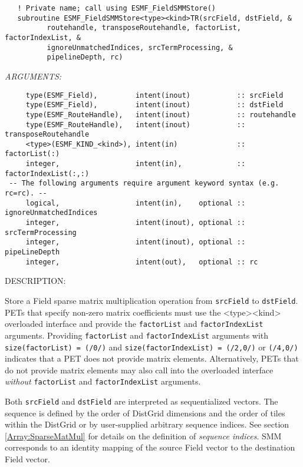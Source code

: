    
\begin{verbatim}   ! Private name; call using ESMF_FieldSMMStore() 
   subroutine ESMF_FieldSMMStore<type><kind>TR(srcField, dstField, & 
          routehandle, transposeRoutehandle, factorList, factorIndexList, &
          ignoreUnmatchedIndices, srcTermProcessing, &
          pipelineDepth, rc)
   \end{verbatim}{\em ARGUMENTS:}
\begin{verbatim}     type(ESMF_Field),         intent(inout)           :: srcField  
     type(ESMF_Field),         intent(inout)           :: dstField  
     type(ESMF_RouteHandle),   intent(inout)           :: routehandle
     type(ESMF_RouteHandle),   intent(inout)           :: transposeRoutehandle
     <type>(ESMF_KIND_<kind>), intent(in)              :: factorList(:) 
     integer,                  intent(in),             :: factorIndexList(:,:) 
 -- The following arguments require argument keyword syntax (e.g. rc=rc). --
     logical,                  intent(in),    optional :: ignoreUnmatchedIndices
     integer,                  intent(inout), optional :: srcTermProcessing
     integer,                  intent(inout), optional :: pipeLineDepth
     integer,                  intent(out),   optional :: rc
   \end{verbatim}
{\sf DESCRIPTION:\\ }

 
   
   \begin{sloppypar}
   Store a Field sparse matrix multiplication operation from {\tt srcField}
   to {\tt dstField}. PETs that specify non-zero matrix coefficients must use
   the <type><kind> overloaded interface and provide the {\tt factorList} and
   {\tt factorIndexList} arguments. Providing {\tt factorList} and
   {\tt factorIndexList} arguments with {\tt size(factorList) = (/0/)} and
   {\tt size(factorIndexList) = (/2,0/)} or {\tt (/4,0/)} indicates that a 
   PET does not provide matrix elements. Alternatively, PETs that do not 
   provide matrix elements may also call into the overloaded interface
   {\em without} {\tt factorList} and {\tt factorIndexList} arguments.
   \end{sloppypar}
    
   Both {\tt srcField} and {\tt dstField} are interpreted as sequentialized 
   vectors. The 
   sequence is defined by the order of DistGrid dimensions and the order of 
   tiles within the DistGrid or by user-supplied arbitrary sequence indices. See 
   section \ref{Array:SparseMatMul} for details on the definition of {\em sequence indices}. 
   SMM corresponds to an identity mapping of the source Field vector to 
   the destination Field vector. 
    
